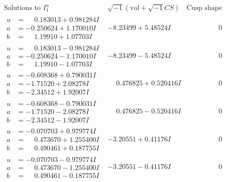 \documentclass[1p]{elsarticle_modified}
\theoremstyle{definition}
\newcommand{\I}{\sqrt{-1}}
\begin{document}
$$\begin{array}{c|c|c}  
\text{Solutions to }I^u_{1}& \I (\text{vol} + \sqrt{-1}CS) & \text{Cusp shape}\\
 \hline 
\begin{aligned}
u &= \phantom{-}0.183013 + 0.981284 I \\
a &= -0.250624 + 1.170010 I \\
b &= \phantom{-}1.19910 + 1.07703 I\end{aligned}
 & -8.23499 + 5.48524 I & \phantom{-0.000000 } 0 \\ \hline\begin{aligned}
u &= \phantom{-}0.183013 - 0.981284 I \\
a &= -0.250624 - 1.170010 I \\
b &= \phantom{-}1.19910 - 1.07703 I\end{aligned}
 & -8.23499 - 5.48524 I & \phantom{-0.000000 } 0 \\ \hline\begin{aligned}
u &= -0.608368 + 0.790031 I \\
a &= -1.71520 + 2.08278 I \\
b &= -2.34512 + 1.92007 I\end{aligned}
 & \phantom{-}0.476825 + 0.520416 I & \phantom{-0.000000 } 0 \\ \hline\begin{aligned}
u &= -0.608368 - 0.790031 I \\
a &= -1.71520 - 2.08278 I \\
b &= -2.34512 - 1.92007 I\end{aligned}
 & \phantom{-}0.476825 - 0.520416 I & \phantom{-0.000000 } 0 \\ \hline\begin{aligned}
u &= -0.070703 + 0.979774 I \\
a &= \phantom{-}0.473670 + 1.255400 I \\
b &= \phantom{-}0.490461 + 0.187755 I\end{aligned}
 & -3.20551 + 0.41176 I & \phantom{-0.000000 } 0 \\ \hline\begin{aligned}
u &= -0.070703 - 0.979774 I \\
a &= \phantom{-}0.473670 - 1.255400 I \\
b &= \phantom{-}0.490461 - 0.187755 I\end{aligned}
 & -3.20551 - 0.41176 I & \phantom{-0.000000 } 0 \\ \hline\begin{aligned}

\end{aligned}
\end{array}$$
\end{document}
